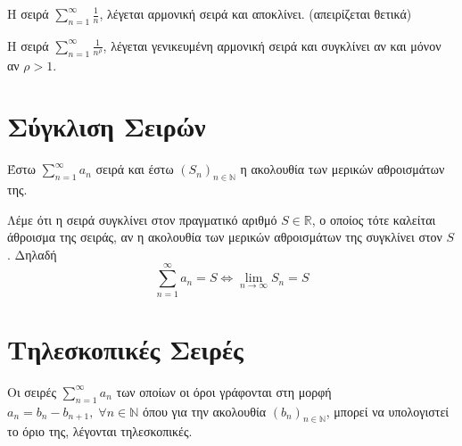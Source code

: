 \documentclass[main.tex]{subfiles}
\begin{document}
\begin{rems}
\item {}
    \begin{myitemize}
    \item Η σειρά $ \sum_{n=1}^{\infty} \frac{1}{n}  $, λέγεται 
        \textcolor{Col2}{αρμονική σειρά} και αποκλίνει. (απειρίζεται θετικά)
    \item Η σειρά $ \sum_{n=1}^{\infty} \frac{1}{n^{\rho}}  $, λέγεται 
        \textcolor{Col2}{γενικευμένη αρμονική σειρά} και συγκλίνει αν και μόνον αν 
        $ \rho > 1 $.
    \end{myitemize}
\end{rems}

\section{Σύγκλιση Σειρών}

Έστω $ \sum_{n=1}^{\infty} a_{n}  $ σειρά και έστω $ {(S_{n})}_{n \in \mathbb{N}} $ 
η ακολουθία των μερικών αθροισμάτων της. 

Λέμε ότι η σειρά \textcolor{Col2}{συγκλίνει} στον πραγματικό αριθμό 
$ S \in \mathbb{R} $, ο οποίος 
τότε καλείται \textcolor{Col2}{άθροισμα} της σειράς, αν η ακολουθία των 
μερικών αθροισμάτων της συγκλίνει στον $ S $. Δηλαδή
\[
    \sum_{n=1}^{\infty} a_{n} = S \Leftrightarrow \lim_{n \to \infty} S_{n} = S  
\] 

\section{Τηλεσκοπικές Σειρές}

\begin{dfn}
    Οι σειρές $ \sum_{n=1}^{\infty} a_{n} $ των οποίων 
    οι όροι γράφονται στη μορφή 
    $ a_{n} = b_{n} - b_{n+1}, \; \forall n \in \mathbb{N} $ όπου για την ακολουθία
    $ {(b_{n})}_{n \in \mathbb{N}}$, μπορεί να υπολογιστεί το όριο της, λέγονται 
    τηλεσκοπικές.
\end{dfn}
\end{document}
